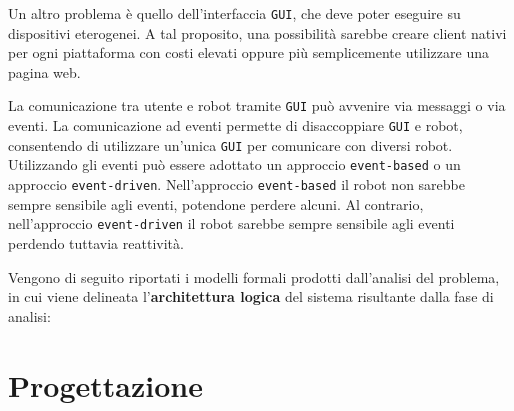 \documentclass{llncs}
\newcommand{\version}{7}
\newcommand{\action}[1]{\texttt{#1}\xspace}
\newcommand{\code}[1]{{\color{blue}\small{\texttt{#1}}}}
\newcommand{\labelsec}[1]{\label{sec:#1}}
\begin{document}
Un altro problema è quello dell'interfaccia \action{GUI}, che deve poter eseguire su dispositivi eterogenei. A tal proposito, una possibilità sarebbe creare client nativi per ogni piattaforma con costi elevati oppure più semplicemente utilizzare una pagina web. 

La comunicazione tra utente e robot tramite \action{GUI} può avvenire via messaggi o via eventi. La comunicazione ad eventi permette di disaccoppiare \action{GUI} e robot, consentendo di utilizzare un'unica \action{GUI} per comunicare con diversi robot. Utilizzando gli eventi può essere adottato un approccio \code{event-based} o un approccio \code{event-driven}. Nell'approccio \code{event-based} il robot non sarebbe sempre sensibile agli eventi, potendone perdere alcuni. Al contrario, nell'approccio \code{event-driven} il robot sarebbe sempre sensibile agli eventi perdendo tuttavia reattività.

Vengono di seguito riportati i modelli formali prodotti dall'analisi del problema, in cui viene delineata l'\textbf{architettura logica} del sistema risultante dalla fase di analisi: 





\section{Progettazione}
\labelsec{Project}

\end{document}
